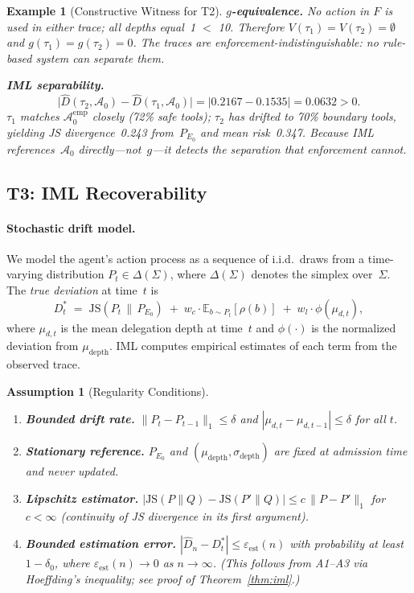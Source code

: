 \documentclass[11pt]{article}
\newtheorem{assumption}{Assumption}[section]
\newtheorem{example}{Example}[section]
\newcommand{\Azero}{\mathcal{A}_0}
\newcommand{\Dhat}{\widehat{D}}
\newcommand{\JS}{\mathrm{JS}}
\newcommand{\E}{\mathbb{E}}
\begin{document}
\begin{example}[Constructive Witness for T2]
\textbf{$g$-equivalence.}
No action in $F$ is used in either trace; all depths equal~1 $<$ 10.
Therefore $V(\tau_1) = V(\tau_2) = \emptyset$ and $g(\tau_1) = g(\tau_2) = 0$.
The traces are \emph{enforcement-indistinguishable}: no rule-based system can
separate them.

\textbf{IML separability.}
\[
  \bigl|\Dhat(\tau_2,\Azero) - \Dhat(\tau_1,\Azero)\bigr|
  = |0.2167 - 0.1535| = 0.0632 > 0.
\]
$\tau_1$ matches $\Azero^{\mathrm{emp}}$ closely (72\% safe tools);
$\tau_2$ has drifted to 70\% boundary tools, yielding JS divergence~0.243
from~$P_{E_0}$ and mean risk~0.347.  Because IML references~$\Azero$
directly---not~$g$---it detects the separation that enforcement cannot.
\end{example}

\subsection{T3: IML Recoverability}

\paragraph{Stochastic drift model.}
We model the agent's action process as a sequence of i.i.d.\ draws from a
time-varying distribution $P_t \in \Delta(\Sigma)$, where $\Delta(\Sigma)$
denotes the simplex over~$\Sigma$.  The \emph{true deviation} at time~$t$ is
\[
  D_t^* \;=\; \JS(P_t \,\|\, P_{E_0})
  \;+\; w_c \cdot \E_{b \sim P_t}[\rho(b)]
  \;+\; w_l \cdot \phi(\mu_{d,t}),
\]
where $\mu_{d,t}$ is the mean delegation depth at time~$t$ and
$\phi(\cdot)$ is the normalized deviation from $\mu_{\mathrm{depth}}$.
IML computes empirical estimates of each term from the observed trace.

\begin{assumption}[Regularity Conditions]
\label{asm:regularity}
\begin{enumerate}[label=\textup{(A\arabic*)}, nosep, leftmargin=2em]
  \item \textbf{Bounded drift rate.}
        $\|P_t - P_{t-1}\|_1 \leq \delta$ and
        $|\mu_{d,t} - \mu_{d,t-1}| \leq \delta$ for all $t$.
  \item \textbf{Stationary reference.}
        $P_{E_0}$ and $(\mu_{\mathrm{depth}}, \sigma_{\mathrm{depth}})$
        are fixed at admission time and never updated.
  \item \textbf{Lipschitz estimator.}
        $|\JS(P \| Q) - \JS(P' \| Q)| \leq c\,\|P - P'\|_1$ for $c < \infty$
        (continuity of JS divergence in its first argument).
  \item \textbf{Bounded estimation error.}
        $|\Dhat_n - D_t^*| \leq \varepsilon_{\mathrm{est}}(n)$ with
        probability at least $1-\delta_0$, where
        $\varepsilon_{\mathrm{est}}(n) \to 0$ as $n \to \infty$.
        (This follows from A1--A3 via Hoeffding's inequality; see proof
        of Theorem~\ref{thm:iml}.)
\end{enumerate}
\end{assumption}
\end{document}
